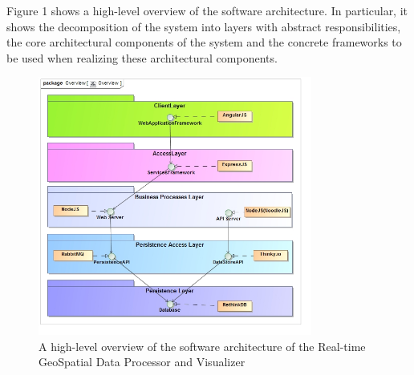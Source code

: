 Figure 1 shows a high-level overview of the software architecture. In particular, it shows the decomposition of the system into layers with abstract responsibilities, the core architectural components of the system and the concrete frameworks to be used when realizing these architectural components.

\begin{figure}[ht!]
\centering
\includegraphics[width=90mm]{../images/Overview.jpg}
\caption{A high-level overview of the software architecture of the Real-time GeoSpatial Data Processor and Visualizer \label{overflow}}
\end{figure}